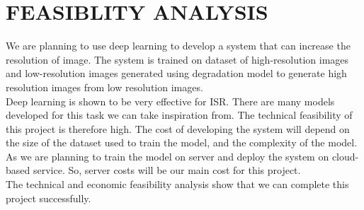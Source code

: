 \newpage
\section{FEASIBLITY ANALYSIS}
We are planning to use deep learning to develop a system that can increase the
resolution of image. The system is trained on dataset of high-resolution images and
low-resolution images generated using degradation model to generate high resolution
images from low resolution images.\\
Deep learning is shown to be very effective for ISR. There are many models
developed for this task we can take inspiration from. The technical feasibility of this
project is therefore high. The cost of developing the system will depend on the size of
the dataset used to train the model, and the complexity of the model. As we are planning
to train the model on server and deploy the system on cloud-based service. So, server
costs will be our main cost for this project. \\
The technical and economic feasibility analysis show that we can complete this
project successfully.